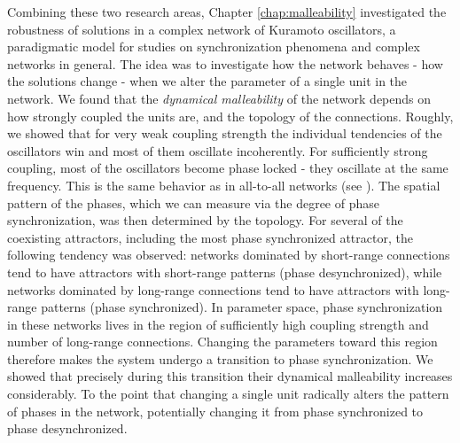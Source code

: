 Combining these two research areas, Chapter \ref{chap:malleability} investigated the robustness of solutions in a complex network of Kuramoto oscillators, a paradigmatic model for studies on synchronization phenomena and complex networks in general. The idea was to investigate how the network behaves - how the solutions change - when we alter the parameter of a single unit in the network. We found that the \textit{dynamical malleability} of the network depends on how strongly coupled the units are, and the topology of the connections. 
Roughly, we showed that for very weak coupling strength the individual tendencies of the oscillators win and most of them oscillate incoherently. For sufficiently strong coupling, most of the oscillators become phase locked - they oscillate at the same frequency. This is the same behavior as in all-to-all networks (see ). The spatial pattern of the phases, which we can measure via the degree of phase synchronization, was then determined by the topology. For several of the coexisting attractors, including the most phase synchronized attractor, the following tendency was observed: networks dominated by short-range connections tend to have attractors with short-range patterns (phase desynchronized), while networks dominated by long-range connections tend to have attractors with long-range patterns (phase synchronized). 
In parameter space, phase synchronization in these networks lives in the region of sufficiently high coupling strength and number of long-range connections. Changing the parameters toward this region therefore makes the system undergo a transition to phase synchronization. We showed that precisely during this transition their dynamical malleability increases considerably. To the point that changing a single unit radically alters the pattern of phases in the network, potentially changing it from phase synchronized to phase desynchronized. 

